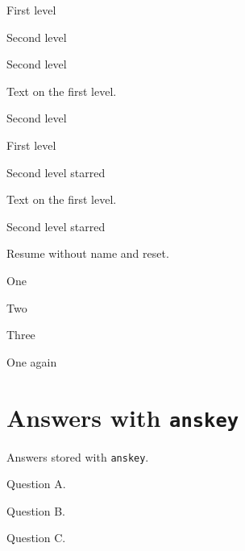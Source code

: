 \documentclass{article}
\begin{document}
\begin{enumext}
  \item First level
    \begin{enumext}[series=foo]
      \item Second level
      \item Second level
    \end{enumext}
    Text on the first level.
    \begin{enumext}[resume=foo]
      \item Second level
    \end{enumext}
  \item First level
    \begin{enumext*}[series=baz]
      \item Second level starred
    \end{enumext*}
    Text on the first level.
    \begin{enumext*}[resume=baz]
      \item Second level starred
    \end{enumext*}
\end{enumext}

Resume without name and reset.

\begin{enumext}
  \item One
  \item Two
\end{enumext}

\begin{enumext}[resume*]
  \item Three
\end{enumext}

\begin{enumext}[reset]
  \item One again
\end{enumext}

\section{Answers with \texttt{anskey}}

Answers stored with \texttt{anskey}.

\begin{enumext}[save-ans=one, save-sep={ }, save-ref=true]
  \item Question A. 
  \item Question B. 
  \item Question C. 
\end{enumext}
\end{document}
